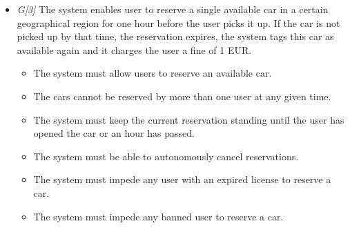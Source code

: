 \begin{itemize}
				\item \textit{G[3]} The system enables user to reserve a single available car in a certain geographical region for one hour before the user picks it up. If the car is not picked up by that time, the reservation expires, the system tags this car as available again and it charges the user a fine of 1 EUR.
					\begin{itemize}
						\item The system must allow users to reserve an available car.
						\item The cars cannot be reserved by more than one user at any given time.
						\item The system must keep the current reservation standing until the user has opened the car or an hour has passed. %
						\item The system must be able to autonomously cancel reservations.
						
						\item The system must impede any user with an expired license to reserve a car.
						\item The system must impede any banned user to reserve a car.
					\end{itemize}


\end{itemize}
